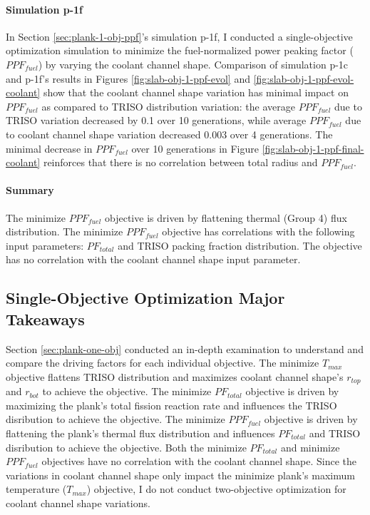 \paragraph{Simulation p-1f}
In Section \ref{sec:plank-1-obj-ppf}'s simulation p-1f, I conducted a single-objective 
optimization simulation to minimize the fuel-normalized power peaking factor ($PPF_{fuel}$) 
by varying the coolant channel shape.
Comparison of simulation p-1c and p-1f's results in Figures 
\ref{fig:slab-obj-1-ppf-evol} and \ref{fig:slab-obj-1-ppf-evol-coolant} 
show that the coolant channel shape variation has minimal impact on $PPF_{fuel}$ as 
compared to \gls{TRISO} distribution variation: the average $PPF_{fuel}$ due 
to \gls{TRISO} variation decreased by 0.1 over 10 generations, while average 
$PPF_{fuel}$ due to coolant channel shape variation decreased 0.003 over 
4 generations. 
The minimal decrease in $PPF_{fuel}$ over 10 generations in Figure 
\ref{fig:slab-obj-1-ppf-final-coolant} reinforces that there is 
no correlation between total radius and $PPF_{fuel}$. 

\paragraph{Summary}
The minimize $PPF_{fuel}$ objective is driven by flattening thermal (Group 4) flux 
distribution. 
The minimize $PPF_{fuel}$ objective has correlations with the following input parameters: 
$PF_{total}$ and TRISO packing fraction distribution. 
The objective has no correlation with the coolant channel shape input parameter.

\subsection{Single-Objective Optimization Major Takeaways}
Section \ref{sec:plank-one-obj} conducted an in-depth examination to understand 
and compare the driving factors for each individual objective. 
The minimize $T_{max}$ objective flattens TRISO distribution and maximizes coolant 
channel shape's $r_{top}$ and $r_{bot}$ to achieve the objective. 
The minimize $PF_{total}$ objective is driven by maximizing the plank's total fission 
reaction rate and influences the TRISO disribution to achieve the objective. 
The minimize $PPF_{fuel}$ objective is driven by flattening the plank's thermal flux
distribution and influences $PF_{total}$ and TRISO disribution to achieve the objective. 
Both the minimize $PF_{total}$ and minimize $PPF_{fuel}$ objectives have no correlation 
with the coolant channel shape. 
Since the variations in coolant channel shape only impact the minimize plank's maximum 
temperature ($T_{max}$) objective, I do not conduct two-objective 
optimization for coolant channel shape variations.  

